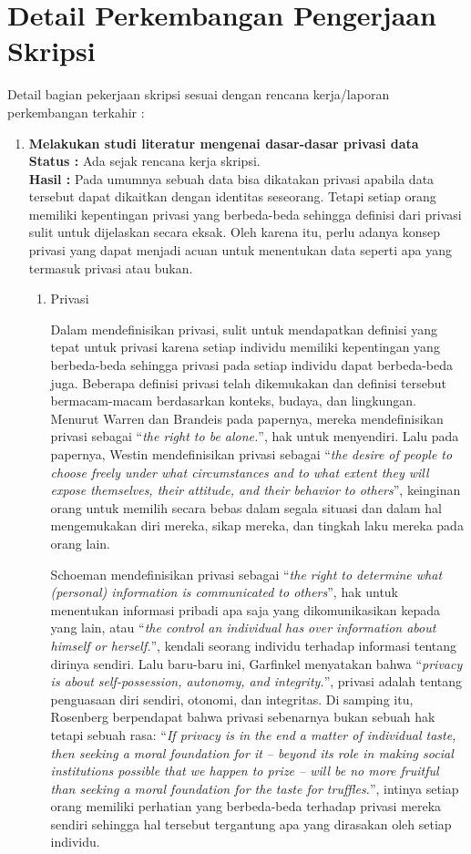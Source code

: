 \documentclass[a4paper,twoside]{article}
\begin{document}
\section{Detail Perkembangan Pengerjaan Skripsi}
Detail bagian pekerjaan skripsi sesuai dengan rencana kerja/laporan perkembangan terkahir :
	\begin{enumerate}
		\item \textbf{Melakukan studi literatur mengenai dasar-dasar privasi data}\\
		{\bf Status :} Ada sejak rencana kerja skripsi.\\
		{\bf Hasil :} Pada umumnya sebuah data bisa dikatakan privasi apabila data tersebut dapat dikaitkan dengan identitas seseorang. Tetapi setiap orang memiliki kepentingan privasi yang berbeda-beda sehingga definisi dari privasi sulit untuk dijelaskan secara eksak. Oleh karena itu, perlu adanya konsep privasi yang dapat menjadi acuan untuk menentukan data seperti apa yang termasuk privasi atau bukan.
		\begin{enumerate}
			\item Privasi
			
			Dalam mendefinisikan privasi, sulit untuk mendapatkan definisi yang tepat untuk privasi karena setiap individu memiliki kepentingan yang berbeda-beda sehingga privasi pada setiap individu dapat berbeda-beda juga. Beberapa definisi privasi telah dikemukakan dan definisi tersebut bermacam-macam berdasarkan konteks, budaya, dan lingkungan. Menurut Warren dan Brandeis pada papernya, mereka mendefinisikan privasi sebagai “\textit{the right to be alone.}”, hak untuk menyendiri. Lalu pada papernya, Westin mendefinisikan privasi sebagai “\textit{the desire of people to choose freely under what circumstances and to what extent they will expose themselves, their attitude, and their behavior to others}”, keinginan orang untuk memilih secara bebas dalam segala situasi dan dalam hal mengemukakan diri mereka, sikap mereka, dan tingkah laku mereka pada orang lain. 
			
			Schoeman mendefinisikan privasi sebagai “\textit{the right to determine what (personal) information is communicated to others}”, hak untuk menentukan informasi pribadi apa saja yang dikomunikasikan kepada yang lain, atau “\textit{the control an individual has over information about himself or herself.}”, kendali seorang individu terhadap informasi tentang dirinya sendiri. Lalu baru-baru ini, Garfinkel menyatakan bahwa “\textit{privacy is about self-possession, autonomy, and integrity.}”, privasi adalah tentang penguasaan diri sendiri, otonomi, dan integritas. Di samping itu, Rosenberg berpendapat bahwa privasi sebenarnya bukan sebuah hak tetapi sebuah rasa: “\textit{If privacy is in the end a matter of individual taste, then seeking a moral foundation for it -- beyond its role in making social institutions possible that we happen to prize -- will be no more fruitful than seeking a moral foundation for the taste for truffles.}”, intinya setiap orang memiliki perhatian yang berbeda-beda terhadap privasi mereka sendiri sehingga hal tersebut tergantung apa yang dirasakan oleh setiap individu.


\end{enumerate}
\end{enumerate}
\end{document}
